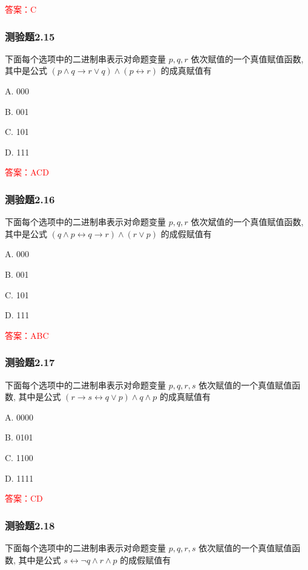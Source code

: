 \documentclass[UTF8, heading=true]{ctexart}
\begin{document}
\textcolor{red}{答案：C}

\subsubsection{测验题2.15}

下面每个选项中的二进制串表示对命题变量 $p, q, r$ 依次赋值的一个真值赋值函数, 其中是公式 $(p \wedge q \rightarrow r \vee q) \wedge(p \leftrightarrow r)$ 的成真赋值有 $\qquad$

A. 000

B. 001

C. 101

D. 111

\textcolor{red}{答案：ACD}


\subsubsection{测验题2.16}

下面每个选项中的二进制串表示对命题变量 $p, q, r$ 依次斌值的一个真值赋值函数, 其中是公式 $(q \wedge p \leftrightarrow q \rightarrow r) \wedge(r \vee p)$ 的成假赋值有 $\qquad$

A. 000

B. 001

C. 101

D. 111

\textcolor{red}{答案：ABC}

\subsubsection{测验题2.17}

下面每个选项中的二进制串表示对命题变量 $p, q, r, s$ 依次赋值的一个真值赋值函数, 其中是公式 $(r \rightarrow s \leftrightarrow q \vee p) \wedge q \wedge p$ 的成真赋值有 $\qquad$

A. 0000

B. 0101

C. 1100

D. 1111

\textcolor{red}{答案：CD}

\subsubsection{测验题2.18}

下面每个选项中的二进制串表示对命题变量 $p, q, r, s$ 依次赋值的一个真值赋值函数, 其中是公式 $s \leftrightarrow \neg q \wedge r \wedge p$ 的成假赋值有 $\qquad$
\end{document}
